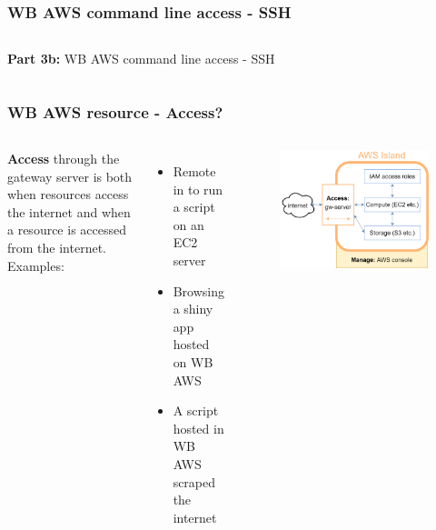 \documentclass[aspectratio=169]{beamer} %
\begin{document}
\begin{frame}
	\frametitle{WB AWS command line access - SSH}
	\begin{columns}[c]
		
		
		\textbf{Part 3b:} WB AWS command line access - SSH
		
	\end{columns}
\end{frame}


\begin{frame}
	\frametitle{WB AWS resource - Access?}
	\begin{columns}[c]
		\textbf{Access} through the gateway server is both
		when resources access the internet and
		when a resource is accessed from the internet.
		\vspace{.5cm}\newline
		Examples:
		\begin{itemize}
			\item Remote in to run a script on an EC2 server
			\item Browsing a shiny app hosted on WB AWS
			\item A script hosted in WB AWS scraped the internet
		\end{itemize}

		\begin{figure}
			\centering
			\includegraphics[width=\textwidth]{./img/wb-aws.png}
		\end{figure}

	\end{columns}
\end{frame}
\end{document}
